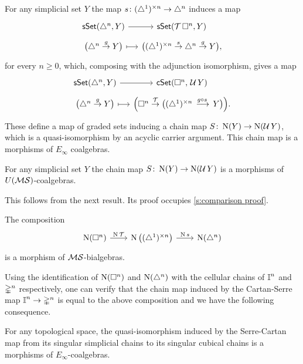For any simplicial set $Y$ the map $s \colon (\triangle^1)^{\times n} \to \triangle^n$ induces a map
\begin{equation*}
\begin{tikzcd}[column sep = small, row sep=tiny]
\sSet(\simplex^n, Y) \arrow[r] &
\sSet(\T \cube^n, Y) \\
\big( \simplex^n \stackrel{g}{\to} Y \big) \arrow[r, maps to] &
\big(\scube{n} \stackrel{s}{\to} \simplex^n \stackrel{g}{\to} Y \big),
\end{tikzcd}
\end{equation*}
for every $n \geq 0$, which, composing with the adjunction isomorphism, gives a map
\begin{equation*}
\begin{tikzcd}[column sep = small, row sep=tiny]
\sSet(\simplex^n, Y) \arrow[r] &
\cSet(\cube^n,\, \U Y) \\
\big( \simplex^n \stackrel{g}{\to} Y \big) \arrow[r, maps to] &
\Big(\cube^n \stackrel{\T}{\to} \big(\scube{n} \stackrel{g \circ s\,}{\, \longrightarrow\, } Y \big)\Big).
\end{tikzcd}
\end{equation*}
These define a map of graded sets inducing a chain map $S \colon \operatorname{N}(Y) \to \operatorname{N}(\operatorname{\mathcal{U}} Y)$, which is a quasi-isomorphism by an acyclic carrier argument.
This chain map is a morphisms of $E_\infty$ coalgebras.

\begin{theorem} \label{t:comparison}
	For any simplicial set $Y$ the chain map $S \colon \operatorname{N}(Y) \to \operatorname{N}(\operatorname{\mathcal{U}} Y)$ is a morphisms of $U(\mathcal{MS})$-coalgebras.
\end{theorem}

This follows from the next result.
Its proof occupies \cref{s:comparison proof}.

\begin{lemma} \label{l:main comparison lemma}
	The composition
	\begin{equation*}
	\begin{tikzcd}[column sep=normal]
	\chains(\cube^n) \arrow[r, "\chains \T"] &[-3pt]
	\chains \big( \scube{n} \big) \arrow[r, "\chains s"] &[-3pt]
	\chains(\simplex^n)
	\end{tikzcd}
	\end{equation*}
	is a morphism of $\mathcal{MS}$-bialgebras.
\end{lemma}

Using the identification of $\operatorname{N}(\square^n)$ and $\operatorname{N}(\triangle^n)$ with the cellular chains of $\bm{\mathbb{I}}^n$ and $\mathbb{\Delta}^n$ respectively, one can verify that the chain map induced by the Cartan-Serre map $\bm{\mathbb{I}}^n \to \mathbb{\Delta}^n$ is equal to the above composition and we have the following consequence.

\begin{corollary}
	For any topological space, the quasi-isomorphism induced by the Serre-Cartan map from its singular simplicial chains to its singular cubical chains is a morphisms of $E_\infty$-coalgebras.
\end{corollary}